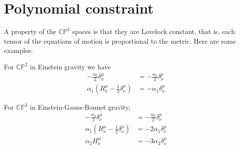 \section{Polynomial constraint}


A property of the $\mathbb{CP}^k$ spaces is that they are Lovelock constant, that is, each tensor of the equations of motion is proportional to the metric. Here are some examples:

For $\mathbb{CP}^2$ in Einstein gravity we have
\begin{align*}
    -\frac{\alpha_0}{2}\delta^\mu_\nu&=-\frac{\alpha_0}{2}\delta^\mu_\nu\\
    \alpha_1\left(R^\mu_\nu-\frac{1}{2}\delta^\mu_\nu\right)&=-\alpha_1\delta^\mu_\nu
\end{align*}

For $\mathbb{CP}^3$ in Einstein-Gauss-Bonnet gravity,
\begin{align*}
    -\frac{\alpha_0}{2}\delta^\mu_\nu&=-\frac{\alpha_0}{2}\delta^\mu_\nu\\
    \alpha_1\left(R^\mu_\nu-\frac{1}{2}\delta^\mu_\nu\right)&=-2\alpha_1\delta^\mu_\nu\\
    \alpha_2 H^\mu_\nu&=-3\alpha_2\delta^\mu_\nu
\end{align*}

